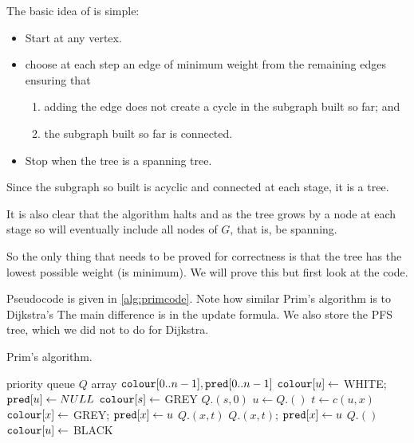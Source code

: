 The basic idea of   is simple:
\begin{itemize}
\item Start at any vertex.
\item choose at each step an edge of minimum weight from the remaining edges ensuring that
\begin{enumerate}
\item adding the edge does not create a cycle in the subgraph built so
far; and 
\item the subgraph built so far is connected.
\end{enumerate}
\item Stop when the tree is a spanning tree.
\end{itemize}

Since the subgraph so built is acyclic and connected at each stage,  it 
is a tree.

It is also clear that the algorithm halts and as the tree grows by a node at each stage so will eventually include all nodes of $G$, that is,  be spanning. 

So the only thing that needs to be proved for correctness is that the tree has the lowest possible weight (is minimum). We will prove this but first look at the code.

Pseudocode is given in \cref{alg:primcode}. Note how similar Prim's algorithm is to Dijkstra's
The main difference is in the update formula. 
 We also store the PFS tree, which we did not
to do for Dijkstra.


\begin{algorithm}[H]
  \caption{Prim's algorithm.}
  \label{alg:primcode}
\begin{algorithmic}[1]
	\State priority queue $Q$
	\State array $\colour[0..n-1], \pred[0..n-1]$
		\State $\colour[u] \gets$ WHITE; $\pred[u] \gets NULL$ 
	\EndFor
	\State $\colour[s] \gets $ GREY
	\State $Q$.$(s, 0)$
		\State $u \gets Q$.$()$
			\State $t \gets c(u, x)$
				\State $\colour[x] \gets $ GREY; $\pred[x] \gets u$
				\State $Q$.$(x, t)$
				\State $Q$.$(x, t)$; $\pred[x] \gets u$
			\EndIf
		\EndFor
		\State $Q$.$()$
		\State $\colour[u] \gets $ BLACK
	\EndWhile
	\State \Return{$\pred$}
\EndFunction
\end{algorithmic}
\end{algorithm}

